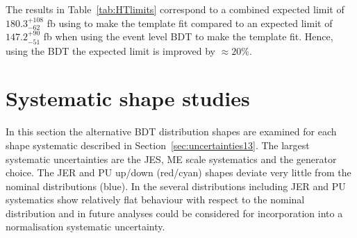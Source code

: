 The results in Table~\ref{tab:HTlimits} correspond to a combined expected limit of $180.3^{+108}_{-62}$ fb using \HT to make the template fit compared to an expected limit of $147.2^{+90}_{-51}$ fb when using the event level BDT to make the template fit. Hence, using the BDT the expected limit is improved by $\approx20\%$.


\section{Systematic shape studies}

In this section the alternative BDT distribution shapes are examined for each shape systematic described in Section~\ref{sec:uncertainties13}. The largest systematic uncertainties are the JES, ME scale systematics and the \ttbar generator choice. The JER and PU up/down (red/cyan) shapes deviate very little from the nominal distributions (blue). In \ttbar the several distributions including JER and PU systematics show relatively flat behaviour with respect to the nominal distribution and in future analyses could be considered for incorporation into a normalisation systematic uncertainty.


